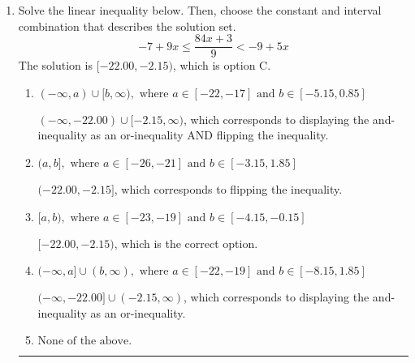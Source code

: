 \documentclass{extbook}[14pt]
\newcommand{\litem}[1]{\item #1

\rule{\textwidth}{0.4pt}}
\begin{document}
\begin{enumerate}
{\begin{enumerate}[label=\Alph*.]
$[26.00, 19.00)$, which is the correct interval but negatives of the actual endpoints.
\item \( (-\infty, a) \cup [b, \infty), \text{ where } a \in [23, 28] \text{ and } b \in [19, 21] \)

$(-\infty, 26.00) \cup [19.00, \infty)$, which corresponds to displaying the and-inequality as an or-inequality AND flipping the inequality AND getting negatives of the actual endpoints.
\item \( (-\infty, a] \cup (b, \infty), \text{ where } a \in [23, 29] \text{ and } b \in [19, 23] \)

$(-\infty, 26.00] \cup (19.00, \infty)$, which corresponds to displaying the and-inequality as an or-inequality and getting negatives of the actual endpoints.
\item \( \text{None of the above.} \)

* This is correct as the answer should be $[-26.00, -19.00)$.
\end{enumerate}

\textbf{General Comment:} To solve, you will need to break up the compound inequality into two inequalities. Be sure to keep track of the inequality! It may be best to draw a number line and graph your solution.
}
\litem{
Solve the linear inequality below. Then, choose the constant and interval combination that describes the solution set.
\[ -7 + 9 x \leq \frac{84 x + 3}{9} < -9 + 5 x \]The solution is \( [-22.00, -2.15) \), which is option C.\begin{enumerate}[label=\Alph*.]
\item \( (-\infty, a) \cup [b, \infty), \text{ where } a \in [-22, -17] \text{ and } b \in [-5.15, 0.85] \)

$(-\infty, -22.00) \cup [-2.15, \infty)$, which corresponds to displaying the and-inequality as an or-inequality AND flipping the inequality.
\item \( (a, b], \text{ where } a \in [-26, -21] \text{ and } b \in [-3.15, 1.85] \)

$(-22.00, -2.15]$, which corresponds to flipping the inequality.
\item \( [a, b), \text{ where } a \in [-23, -19] \text{ and } b \in [-4.15, -0.15] \)

$[-22.00, -2.15)$, which is the correct option.
\item \( (-\infty, a] \cup (b, \infty), \text{ where } a \in [-22, -19] \text{ and } b \in [-8.15, 1.85] \)

$(-\infty, -22.00] \cup (-2.15, \infty)$, which corresponds to displaying the and-inequality as an or-inequality.
\item \( \text{None of the above.} \)



\end{enumerate}}
\end{enumerate}
\end{document}

